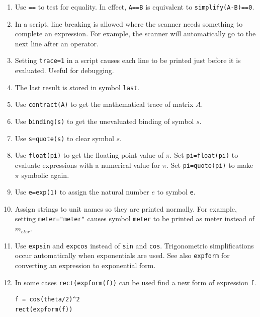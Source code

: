 \documentclass[12pt]{article}
\begin{document}
\begin{enumerate}

\item
Use \verb$==$ to test for equality.
In effect, \verb$A==B$ is equivalent to \verb$simplify(A-B)==0$.

\item
In a script, line breaking is allowed where the scanner needs something to complete an expression.
For example, the scanner will automatically go to the next line after an operator.

\item
Setting \verb$trace=1$ in a script causes each line to be printed just before it is evaluated.
Useful for debugging.

\item
The last result is stored in symbol \verb$last$.

\item
Use \verb$contract(A)$ to get the mathematical trace of matrix $A$.

\item
Use \verb$binding(s)$ to get the unevaluated binding of symbol $s$.

\item
Use \verb$s=quote(s)$ to clear symbol $s$.

\item
Use \verb$float(pi)$ to get the floating point value of $\pi$.
Set \verb$pi=float(pi)$ to evaluate expressions with a numerical value for $\pi$.
Set \verb$pi=quote(pi)$ to make $\pi$ symbolic again.

\item
Use \verb$e=exp(1)$ to assign the natural number $e$ to symbol \verb$e$.

\item
Assign strings to unit names so they are printed normally.
For example, setting \verb$meter="meter"$ causes symbol \verb$meter$
to be printed as meter instead of $m_{eter}$.

\item
Use \verb$expsin$ and \verb$expcos$ instead of \verb$sin$ and \verb$cos$.
Trigonometric simplifications occur automatically when exponentials are used.
See also \verb$expform$ for converting an expression to exponential form.

\item
In some cases \verb$rect(expform(f))$ can be used find a new form of expression \verb$f$.

{\color{blue}
\begin{verbatim}
f = cos(theta/2)^2
rect(expform(f))
\end{verbatim}}


\end{enumerate}
\end{document}
